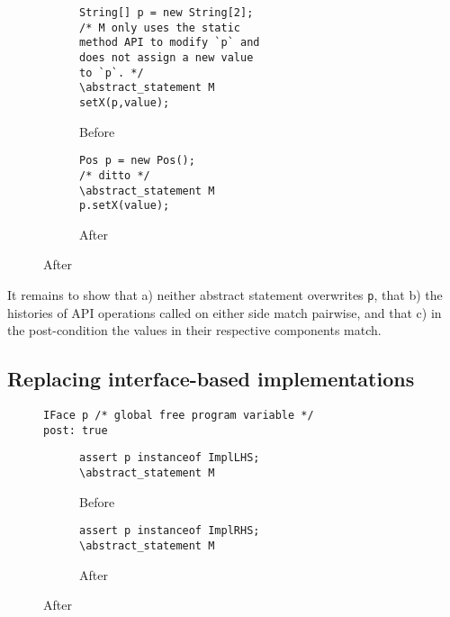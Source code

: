 \begin{figure}
  \begin{subfigure}[h]{.45\linewidth} 
    \begin{lstlisting}[style=smallJava]
String[] p = new String[2];
/* M only uses the static
method API to modify `p` and
does not assign a new value
to `p`. */
\abstract_statement M
setX(p,value);
    \end{lstlisting}
    \caption{Before}
    \label{lst:ArrayBefore}
  \end{subfigure}\hspace{1cm}
  \begin{subfigure}[h]{.45\linewidth}
        \begin{lstlisting}[style=smallJava]
Pos p = new Pos();
/* ditto */
\abstract_statement M
p.setX(value);
    \end{lstlisting}
    \caption{After}
    \label{lst:ArrayAfter}
  \end{subfigure}
  \label{lst:ReplaceArray-REF}
\end{figure}

It remains to show that a) neither abstract statement overwrites \texttt{p}, that b) the histories of API operations called on either side match pairwise,
and that c) in the post-condition the values in their respective components match.


\subsection*{Replacing interface-based implementations}

\begin{figure}
      \begin{lstlisting}[style=smallJava]
IFace p /* global free program variable */
post: true
    \end{lstlisting}

  \begin{subfigure}[h]{.45\linewidth} 
    \begin{lstlisting}[style=smallJava]
assert p instanceof ImplLHS;
\abstract_statement M
    \end{lstlisting}
    \caption{Before}
    \label{lst:IFaceBefore}
  \end{subfigure}\hspace{1cm}
  \begin{subfigure}[h]{.45\linewidth}
        \begin{lstlisting}[style=smallJava]
assert p instanceof ImplRHS;
\abstract_statement M
    \end{lstlisting}
    \caption{After}
    \label{lst:iFaceAfter}
  \end{subfigure}
  \label{lst:refa-ibased}
\end{figure}

